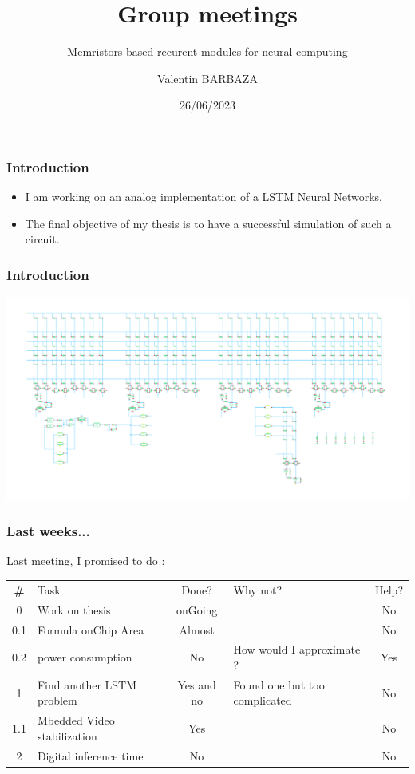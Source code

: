 \documentclass[table]{beamer}
\title{Group meetings}
\subtitle{Memristors-based recurent modules for neural computing}
\author[V. BARBAZA]{Valentin BARBAZA}
\date{26/06/2023}
\begin{document}
  \frame{\titlepage}


  \begin{frame}
    \frametitle{Introduction}

    \begin{itemize}
        \color{text}
      \item I am working on an analog implementation of a LSTM Neural Networks.
      \item The final objective of my thesis is to have a successful simulation of such a circuit.
    \end{itemize}

  \end{frame}


  \begin{frame}
    \frametitle{Introduction}
    \centering\includegraphics[width=\textwidth]{lstm/lstm-np}
  \end{frame}

  \begin{frame}
    \frametitle{Last weeks...}

    Last meeting, I promised to do :

    \centering
    \begin{tabular}{c p{} c p{} c}
      \rowcolor{firstRow}
      \color{white}\textbf{\#} & \centering\color{white}Task & \color{white}Done? & \color{white}Why not? & \color{white}Help? \\
      0 & Work on thesis & onGoing & & No\\
      0.1 & Formula onChip Area & Almost & & No\\
      0.2 & power consumption & No & How would I approximate ? & Yes \\
      1 & Find another LSTM problem & Yes and no & Found one but too complicated & No\\
      1.1 & Mbedded Video stabilization & Yes & & No\\
      2 & Digital inference time & No & & No\\
    \end{tabular}

  \end{frame}
\end{document}

